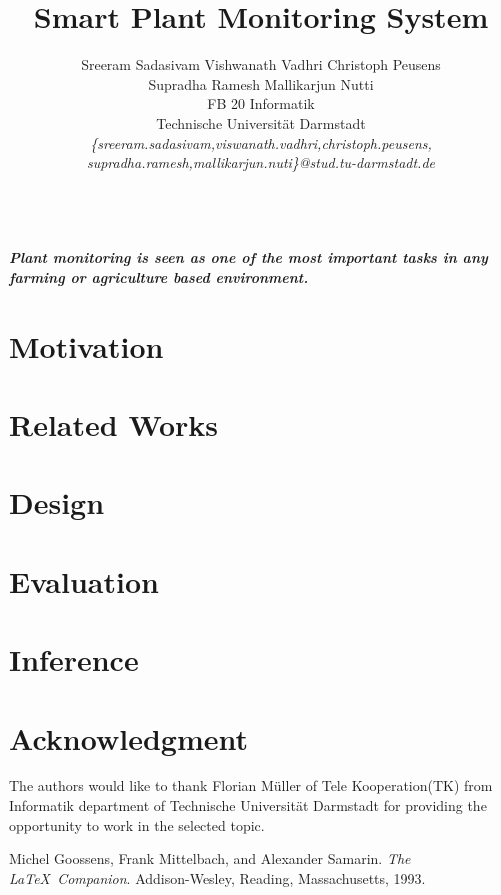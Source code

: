 \documentclass[10pt]{article}
\begin{document}
\title{\textbf{Smart Plant Monitoring System}}
\author{
\quad Sreeram Sadasivam \quad Vishwanath Vadhri \quad Christoph Peusens\\
\quad Supradha Ramesh \quad Mallikarjun Nutti\\
FB 20 Informatik\\
Technische Universität Darmstadt\\
\emph{\{sreeram.sadasivam,viswanath.vadhri,christoph.peusens,}\\
\emph{supradha.ramesh,mallikarjun.nuti\}@stud.tu-darmstadt.de}\\
\date{}
}
\maketitle
\textbf{\abstractname{
\emph {\textbf{\\
Plant monitoring is seen as one of the most important tasks in any farming or agriculture based environment.
 }}}}

\section{Motivation}


\section{Related Works}



\section{Design}


\section{Evaluation}


\section{Inference}


\section*{Acknowledgment}

The authors would like to thank Florian Müller of Tele Kooperation(TK) from Informatik department of Technische Universität Darmstadt for providing the opportunity to work in the selected topic.


\begin{thebibliography}{9}
Michel Goossens, Frank Mittelbach, and Alexander Samarin. 
\textit{The \LaTeX\ Companion}. 
Addison-Wesley, Reading, Massachusetts, 1993.
 
\end{thebibliography}
\end{document}
